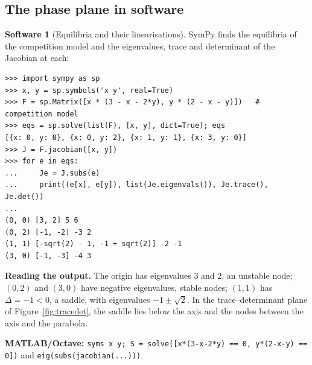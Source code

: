 \documentclass[11pt,a4paper]{article}
\numberwithin{equation}{section}
\theoremstyle{definition}
\newtheorem{software}[thm]{Software}
\begin{document}
\subsection{The phase plane in software}
\label{ssec:software10}

\begin{software}[Equilibria and their linearisations]
\label{sw:equilibria}
SymPy finds the equilibria of the competition model and the eigenvalues, trace and determinant of the Jacobian at each:
{\small\begin{verbatim}
>>> import sympy as sp
>>> x, y = sp.symbols('x y', real=True)
>>> F = sp.Matrix([x * (3 - x - 2*y), y * (2 - x - y)])   # competition model
>>> eqs = sp.solve(list(F), [x, y], dict=True); eqs
[{x: 0, y: 0}, {x: 0, y: 2}, {x: 1, y: 1}, {x: 3, y: 0}]
>>> J = F.jacobian([x, y])
>>> for e in eqs:
...     Je = J.subs(e)
...     print((e[x], e[y]), list(Je.eigenvals()), Je.trace(), Je.det())
...
(0, 0) [3, 2] 5 6
(0, 2) [-1, -2] -3 2
(1, 1) [-sqrt(2) - 1, -1 + sqrt(2)] -2 -1
(3, 0) [-1, -3] -4 3
\end{verbatim}}
\textbf{Reading the output.} The origin has eigenvalues $3$ and $2$, an unstable node; $(0, 2)$ and $(3, 0)$ have negative eigenvalues, stable nodes; $(1, 1)$ has $\Delta = -1 < 0$, a saddle, with eigenvalues $-1 \pm \sqrt2$.
In the trace--determinant plane of Figure~\ref{fig:tracedet}, the saddle lies below the axis and the nodes between the axis and the parabola.

\textbf{MATLAB/Octave:} \texttt{syms x y; S = solve([x*(3-x-2*y) == 0, y*(2-x-y) == 0])} and \texttt{eig(subs(jacobian(...)))}.
\end{software}
\end{document}
